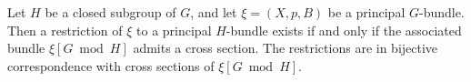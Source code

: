 Let $H$ be a closed subgroup of $G$, and let $\xi = (X, p, B)$ be a principal $G$-bundle. Then a restriction of $\xi$ to a principal $H$-bundle exists if and only if the associated bundle $\xi[G \bmod H]$ admits a cross section. The restrictions are in bijective correspondence with cross sections of $\xi[G \bmod H]$.
